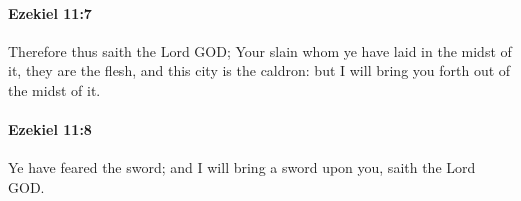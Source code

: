 		\paragraph{Ezekiel 11:7} %
			\label{EZEKIEL-11-7}

			Therefore thus saith the Lord GOD; Your slain whom ye have laid in the midst of it, they are the flesh, and this city is the caldron: but I will bring you forth out of the midst of it.


		\paragraph{Ezekiel 11:8} %
			\label{EZEKIEL-11-8}

			Ye have feared the sword; and I will bring a sword upon you, saith the Lord GOD.


